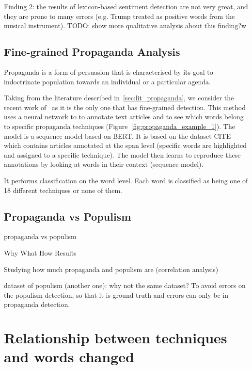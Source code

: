 Finding 2: the results of lexicon-based sentiment detection are not very great, and they are prone to many errors (e.g. Trump treated as positive words from the musical instrument).
TODO: show more qualitative analysis about this finding?w

\subsection{\statusorange Fine-grained Propaganda Analysis}

Propaganda is a form of persuasion that is characterised by its goal to indoctrinate population towards an individual or a particular agenda.

Taking from the literature described in~\ref{sec:lit_propaganda}, we consider the recent work of~\cite{da2019fine} as it is the only one that has fine-grained detection. This method uses a neural network to to annotate text articles and to see which words belong to specific propaganda techniques (Figure~\ref{fig:propaganda_example_1}).
The model is a sequence model based on BERT. It is based on the dataset CITE which contains articles annotated at the span level (specific words are highlighted and assigned to a specific technique). The model then learns to reproduce these annotations by looking at words in their context (sequence model).

It performs classification on the word level. Each word is classified as being one of 18 different techniques or none of them.



\subsection{\statusred Propaganda vs Populism}

propaganda vs populism

Why
What
How
Results

Studying how much propaganda and populism are (correlation analysis)

dataset of populism (another one): why not the same dataset? To avoid errors on the populism detection, so that it is ground truth and errors can only be in propaganda detection.


\section{Relationship between techniques and words changed}
\label{sec:lp_relationship}

